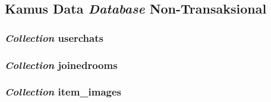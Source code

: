 
\subsection{Kamus Data \textit{Database} Non-Transaksional}


	\subsubsection{\textit{Collection} userchats}
	
	\subsubsection{\textit{Collection} joinedrooms}
	\subsubsection{\textit{Collection} item\_images}
	
	

%   	
    